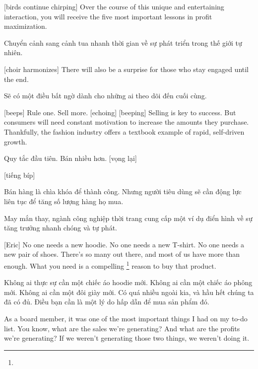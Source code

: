 \documentclass[a4paper]{article}
\begin{document}
	
	[birds continue chirping]
	Over the course of this unique and entertaining interaction, you will receive the five most important lessons in profit maximization.
	
	\begin{vietnamese-v2}
		
		Chuyển cảnh sang cảnh tua nhanh thời gian về sự phát triển trong thế giới tự nhiên.
	\end{vietnamese-v2}
	
	
	[choir harmonizes]
	There will also be a surprise for those who stay engaged until the end.
	
	\begin{vietnamese-v2}
		
		Sẽ có một điều bất ngờ dành cho những ai theo dõi đến cuối cùng.
	\end{vietnamese-v2}
	
	[beeps]
	Rule one.
	Sell more. [echoing]
	[beeping]
	Selling is key to success. But consumers will need constant motivation to increase the amounts they purchase.
	Thankfully, the fashion industry offers a textbook example of rapid, self-driven growth.
	
	\begin{vietnamese-v2}
		
		Quy tắc đầu tiên. Bán nhiều hơn. [vọng lại]
		
		[tiếng bíp]
		
		Bán hàng là chìa khóa để thành công. Nhưng người tiêu dùng sẽ cần động lực liên tục để tăng số lượng hàng họ mua.
		
		May mắn thay, ngành công nghiệp thời trang cung cấp một ví dụ điển hình về sự tăng trưởng nhanh chóng và tự phát.
	\end{vietnamese-v2}
	
	
	[Eric] No one needs a new hoodie. No one needs a new T-shirt. No one needs a new pair of shoes. There's so many out there, and most of us have more than enough. What you need is a compelling \footnote[7]{} reason to buy that product.
	
	\begin{vietnamese-v2}
		[Eric] Không ai thực sự cần một chiếc áo hoodie mới. Không ai cần một chiếc áo phông mới. Không ai cần một đôi giày mới. Có quá nhiều ngoài kia, và hầu hết chúng ta đã có đủ. Điều bạn cần là một lý do hấp dẫn để mua sản phẩm đó.
	\end{vietnamese-v2}
	
	As a board member, it was one of the most important things I had on my to-do list.
	You know, what are the sales we're generating?
	And what are the profits we're generating?
	If we weren't generating those two things, we weren't doing it.
	
\end{document}
